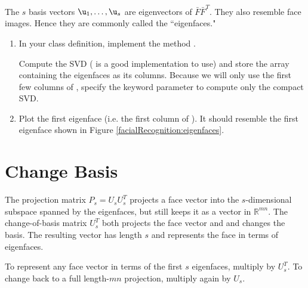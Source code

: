 The $s$ basis vectors $\u_1, \ldots, \u_s$ are eigenvectors of $\bar{F}\bar{F}^T$.
They also resemble face images.
Hence they are commonly called the ``eigenfaces." 

\begin{problem}
\label{prob:svd}
\leavevmode
\begin{enumerate}
\item In your class definition, implement the method .

Compute the SVD ( is a good implementation to use) and store the array  containing the eigenfaces as its columns.
Because we will only use the first few columns of , specify the keyword parameter  to compute only the compact SVD.
\item Plot the first eigenface (i.e. the first column of ).
It should resemble the first eigenface shown in Figure \ref{facialRecognition:eigenfaces}.
\end{enumerate}
\end{problem}

\section*{Change Basis}

The projection matrix $P_s = U_s U_s^T$ projects a face vector into the $s$-dimensional subspace spanned by the eigenfaces, but still keeps it as a vector in $\mathbb{R}^{mn}$. 
The change-of-basis matrix $U_s^T$ both projects the face vector and and changes the basis.
The resulting vector has length $s$ and represents the face in terms of eigenfaces.

To represent any face vector in terms of the first $s$ eigenfaces, multiply by $U_s^T$. 
To change back to a full length-$mn$ projection, multiply again by $U_s$.

